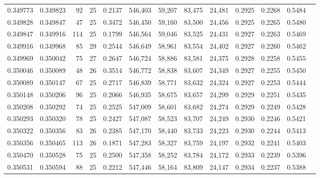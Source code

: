 \begin{tabular}{rrrrrrrrrrrrr}
0.349773 & 0.349823 &    92 &  25 &                                     0.2137 & 546,403 &  59,207 &  83,475 &  24,481 & 0.2925 & 0.2268 & 0.5484 \\
0.349828 & 0.349847 &    47 &  25 &                                     0.3472 & 546,450 &  59,160 &  83,500 &  24,456 & 0.2925 & 0.2265 & 0.5480 \\
0.349847 & 0.349916 &   114 &  25 &                                     0.1799 & 546,564 &  59,046 &  83,525 &  24,431 & 0.2927 & 0.2263 & 0.5469 \\
0.349916 & 0.349968 &    85 &  29 &                                     0.2544 & 546,649 &  58,961 &  83,554 &  24,402 & 0.2927 & 0.2260 & 0.5462 \\
0.349969 & 0.350042 &    75 &  27 &                                     0.2647 & 546,724 &  58,886 &  83,581 &  24,375 & 0.2928 & 0.2258 & 0.5455 \\
0.350046 & 0.350089 &    48 &  26 &                                     0.3514 & 546,772 &  58,838 &  83,607 &  24,349 & 0.2927 & 0.2255 & 0.5450 \\
0.350089 & 0.350147 &    67 &  25 &                                     0.2717 & 546,839 &  58,771 &  83,632 &  24,324 & 0.2927 & 0.2253 & 0.5444 \\
0.350148 & 0.350206 &    96 &  25 &                                     0.2066 & 546,935 &  58,675 &  83,657 &  24,299 & 0.2929 & 0.2251 & 0.5435 \\
0.350208 & 0.350292 &    74 &  25 &                                     0.2525 & 547,009 &  58,601 &  83,682 &  24,274 & 0.2929 & 0.2249 & 0.5428 \\
0.350293 & 0.350320 &    78 &  25 &                                     0.2427 & 547,087 &  58,523 &  83,707 &  24,249 & 0.2930 & 0.2246 & 0.5421 \\
0.350322 & 0.350356 &    83 &  26 &                                     0.2385 & 547,170 &  58,440 &  83,733 &  24,223 & 0.2930 & 0.2244 & 0.5413 \\
0.350356 & 0.350465 &   113 &  26 &                                     0.1871 & 547,283 &  58,327 &  83,759 &  24,197 & 0.2932 & 0.2241 & 0.5403 \\
0.350470 & 0.350528 &    75 &  25 &                                     0.2500 & 547,358 &  58,252 &  83,784 &  24,172 & 0.2933 & 0.2239 & 0.5396 \\
0.350531 & 0.350594 &    88 &  25 &                                     0.2212 & 547,446 &  58,164 &  83,809 &  24,147 & 0.2934 & 0.2237 & 0.5388 \\

\end{tabular}
